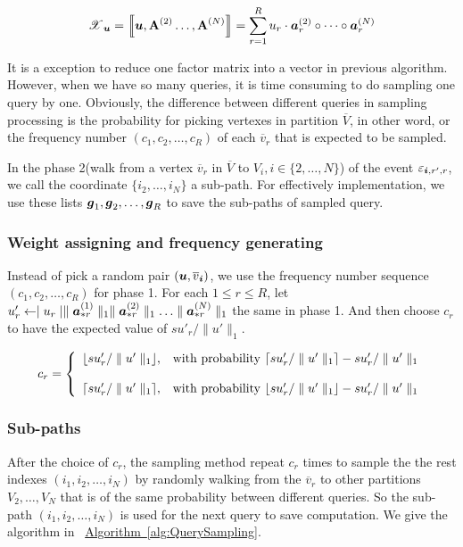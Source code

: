 \documentclass{article}
\newcommand{\T}[1]{\boldsymbol{\mathscr{\MakeUppercase{#1}}}}%
\newcommand{\V}[1]{{\bm{{\MakeLowercase{#1}}}}}%
\newcommand{\VnC}[3]{\V{#1}^{(#2)}_{#3}}%
\newcommand{\Vacol}[1]{\V{a}^{(#1)}_{*r}}
\newcommand{\M}[1]{{\bm{\mathbf{\MakeUppercase{#1}}}}}%
\newcommand{\Mn}[2]{\M{#1}^{(#2)}}%
\newcommand{\norm}[2]{\parallel#1\parallel_{#2}}
\newcommand{\Alg}[1]{\hyperref[alg:#1]{Algorithm~\ref*{alg:#1}}}
\newcommand{\KT}[1]{\left\llbracket #1 \right\rrbracket}
\begin{document}
\begin{equation}\label{eq:RankTensorCP}
\T{X}_{\V{u}}= \KT{ \V{u},\Mn{A}{2}\dots,\Mn{A}{N}} =
\sum_{r=1}^{R} u_r \cdot \VnC{A}{2}{r}\circ \cdots \circ \VnC{A}{N}{r}
\end{equation}

It is a exception to reduce one factor matrix into a vector in previous algorithm. However, when we have so many queries, it is time consuming to do sampling one query by one. Obviously, the difference between different queries in sampling processing is the probability for picking vertexes in partition $\overline{V}$, in other word, or the frequency number $(c_1,c_2,\ldots,c_R)$ of each $\overline{v}_r$ that is expected to be sampled.

In the phase 2(walk from a vertex $\overline{v}_r$ in $\overline{V}$ to $V_i,i\in\{2,\ldots,N\}$) of the event $\varepsilon_{\V{i},r',r}$, we call the coordinate $\{i_2,\ldots,i_N\}$ a sub-path. For effectively implementation, we use these lists $\V{g}_1,\V{g}_2,\ldots,\V{g}_R$ to save the sub-paths of sampled query.


\subsubsection{Weight assigning and frequency generating}
Instead of pick a random pair $(\V{u},\overline{v}_{\V{i}})$, we use the frequency number sequence $(c_1,c_2,\ldots,c_R)$ for phase 1. For each $1 \leq r \leq R$, let $u'_r \leftarrow \mid u_r\mid \norm{\Vacol{1}}{1} \norm{\Vacol{2}}{1} \ldots \norm{\Vacol{N}}{1}$ the same in phase 1.
And then choose $c_r$ to have the expected value of $su'_r/\norm{u'}{1}$.

 \begin{equation*}c_r=
    \left\{
      \begin{array}{ll}
        \lfloor su'_r/\norm{u'}{1} \rfloor,
        & \hbox{with probability $\lceil su'_r/\norm{u'}{1} \rceil - su'_r/\norm{u'}{1}$} \\\\
        \lceil su'_r/\norm{u'}{1} \rceil,
        & \hbox{with probability $\lfloor su'_r/\norm{u'}{1} \rfloor - su'_r/\norm{u'}{1}$}
      \end{array}
    \right.
    \end{equation*}

\subsubsection{Sub-paths}
After the choice of $c_r$, the sampling method repeat $c_r$ times to sample the the rest indexes $(i_1,i_2,\ldots,i_N)$ by randomly walking from the $\overline{v}_r$ to other partitions $V_2,\ldots,V_N$ that is of the same probability between different queries. So the sub-path $(i_1,i_2,\ldots,i_N)$ is used for the next query to save computation. We give the algorithm in ~\Alg{QuerySampling}.
\end{document}

